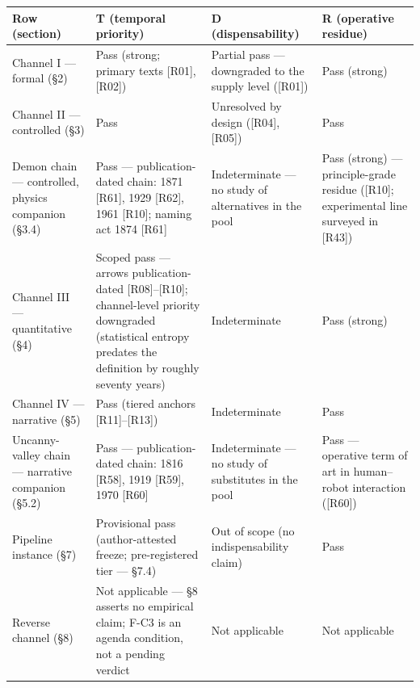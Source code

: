 \documentclass[11pt,a4paper]{article}
\begin{document}
\begin{table}[htbp]
\centering
\footnotesize
\setlength{\tabcolsep}{3.5pt}
\renewcommand{\arraystretch}{1.18}
\begin{tabularx}{0.985\textwidth}{@{}>{\raggedright\arraybackslash}p{}>{\raggedright\arraybackslash}X>{\raggedright\arraybackslash}X>{\raggedright\arraybackslash}X@{}}
\toprule
\textbf{Row (section)} & \textbf{T (temporal priority)} & \textbf{D (dispensability)} & \textbf{R (operative residue)} \\
\midrule
Channel I — formal (§2) & Pass (strong; primary texts [R01], [R02]) & Partial pass — downgraded to the supply level ([R01]) & Pass (strong) \\
Channel II — controlled (§3) & Pass & Unresolved by design ([R04], [R05]) & Pass \\
Demon chain — controlled, physics companion (§3.4) & Pass — publication-dated chain: 1871 [R61], 1929 [R62], 1961 [R10]; naming act 1874 [R61] & Indeterminate — no study of alternatives in the pool & Pass (strong) — principle-grade residue ([R10]; experimental line surveyed in [R43]) \\
Channel III — quantitative (§4) & Scoped pass — arrows publication-dated [R08]–[R10]; channel-level priority downgraded (statistical entropy predates the definition by roughly seventy years) & Indeterminate & Pass (strong) \\
Channel IV — narrative (§5) & Pass (tiered anchors [R11]–[R13]) & Indeterminate & Pass \\
Uncanny-valley chain — narrative companion (§5.2) & Pass — publication-dated chain: 1816 [R58], 1919 [R59], 1970 [R60] & Indeterminate — no study of substitutes in the pool & Pass — operative term of art in human--robot interaction ([R60]) \\
Pipeline instance (§7) & Provisional pass (author-attested freeze; pre-registered tier — §7.4) & Out of scope (no indispensability claim) & Pass \\
Reverse channel (§8) & Not applicable — §8 asserts no empirical claim; F-C3 is an agenda condition, not a pending verdict & Not applicable & Not applicable \\
\bottomrule
\end{tabularx}
\end{table}
\end{document}
